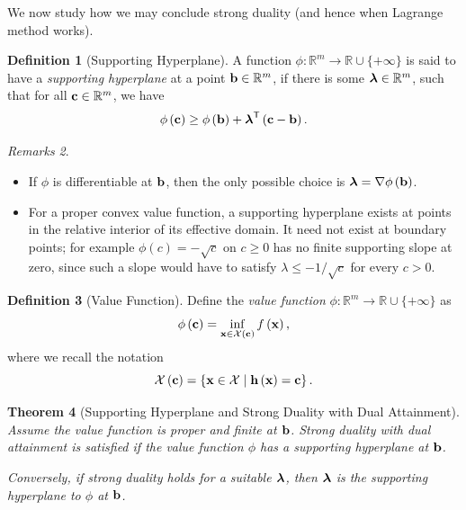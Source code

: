 \documentclass[11pt]{article}
\newtheorem{theorem}{Theorem}[section]
\theoremstyle{definition}
\newtheorem{definition}[theorem]{Definition}
\theoremstyle{remark}
\newtheorem{remarks}[theorem]{Remarks}
\newcommand{\pqty}[1]{\left(#1\right)}
\newcommand{\set}[2]{\left\{#1\mid #2\right\}}
\newcommand{\functiondomain}[3]{#1:#2\to #3}
\newcommand{\RR}{\mathbb{R}}
\newcommand{\transpose}{^{\mathsf{T}}}
\newcommand{\grad}{\nabla}
\begin{document}
We now study how we may conclude strong duality (and hence when Lagrange method works).

\begin{definition}[Supporting Hyperplane]\label{optim-unit-0035}
    A function \(\functiondomain{\phi}{\RR^m}{\RR\cup\{+\infty\}}\) is said to have a \emph{supporting hyperplane} at a point \(\vb{b} \in \RR^m\), if there is some \(\vb*{\lambda} \in \RR^m\), such that for all \(\vb{c} \in \RR^m\), we have
    \[
        \phi\pqty{\vb{c}} \geq \phi\pqty{\vb{b}} + \vb*{\lambda}\transpose \pqty{\vb{c} - \vb{b}}.
    \]
\end{definition}

\begin{remarks}\label{optim-unit-0036}
    \begin{itemize}
        \item If \(\phi\) is differentiable at \(\vb{b}\), then the only possible choice is \(\vb*{\lambda} = \grad \phi \pqty{\vb{b}}\).
        \item For a proper convex value function, a supporting hyperplane exists at points in the relative interior of its effective domain. It need not exist at boundary points; for example \(\phi(c)=-\sqrt c\) on \(c\ge0\) has no finite supporting slope at zero, since such a slope would have to satisfy \(\lambda\le-1/\sqrt c\) for every \(c>0\).
    \end{itemize}
\end{remarks}

\begin{definition}[Value Function]\label{optim-unit-0037}
    Define the \emph{value function} \(\functiondomain{\phi}{\RR^m}{\RR\cup\{+\infty\}}\) as
    \[
        \phi\pqty{\vb{c}} = \inf_{\vb{x} \in \mathcal{X} \pqty{\vb{c}}} f\pqty{\vb{x}},
    \]
    where we recall the notation
    \[
        \mathcal{X} \pqty{\vb{c}} = \set{\vb{x} \in \mathcal{X}}{\vb{h}\pqty{\vb{x}} = \vb{c}}.
    \]
\end{definition}

\begin{theorem}[Supporting Hyperplane and Strong Duality with Dual Attainment]\label{optim-unit-0038}
    Assume the value function is proper and finite at \(\vb{b}\). Strong duality with dual attainment is satisfied if the value function \(\phi\) has a supporting hyperplane at \(\vb{b}\).

    Conversely, if strong duality holds for a suitable \(\vb*{\lambda}\), then \(\vb*{\lambda}\) is the supporting hyperplane to \(\phi\) at \(\vb{b}\).
\end{theorem}
\end{document}

